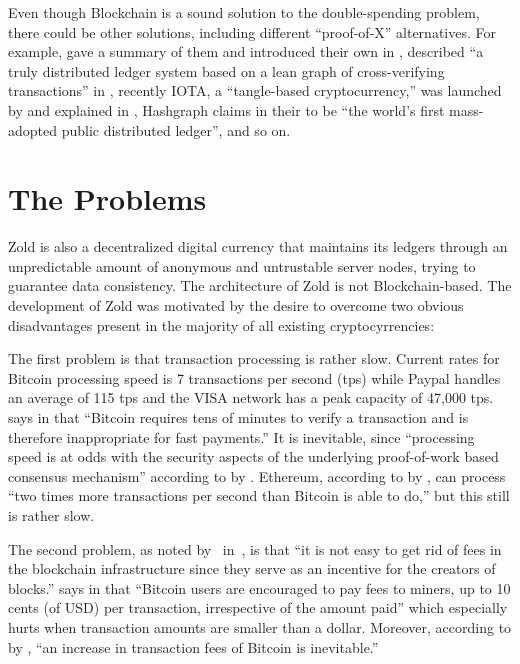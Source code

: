 \documentclass[12pt,oneside]{article}
\begin{document}
Even though Blockchain is a sound solution to the double-spending
problem, there could be other solutions,
including different ``proof-of-X'' alternatives.%
For example, \citeauthor{everaere2010} gave
a summary of them and introduced their own in ,
\citeauthor{boyen2016} described
``a truly distributed ledger system based on a lean graph of cross-verifying transactions''
in ,
recently IOTA, a ``tangle-based cryptocurrency,'' was launched by
\citeauthor{popov2017} and explained in ,
Hashgraph claims in their 
to be ``the world's first mass-adopted public distributed ledger'',
and so on.

\pagebreak

\section*{The Problems}

Zold is also a decentralized digital currency that maintains its ledgers
through an unpredictable amount of anonymous and untrustable server nodes, trying to guarantee
data consistency. The architecture of Zold is not Blockchain-based.
The development of Zold was motivated by the desire to overcome
two obvious disadvantages present in the majority of all existing cryptocyrrencies:

The first problem is that transaction processing is rather slow.
Current rates for Bitcoin processing speed is 7 transactions per second (tps)
while Paypal handles an average of 115 tps and the VISA
network has a peak capacity of 47,000 tps.
\citeauthor{karame2012} says in 
that ``Bitcoin requires tens of minutes to verify a transaction
and is therefore inappropriate for fast payments.''
It is inevitable, since
``processing speed is at odds with the security aspects of the underlying
proof-of-work based consensus mechanism'' according
to  by \citeauthor{kiayias2015}.
Ethereum, according to  by \citeauthor{fekkes2018}, can process
``two times more transactions per second than Bitcoin is able to do,''
but this still is rather slow.

The second problem, as noted by~\citeauthor{popov2017} in~,
is that ``it is not easy to get rid
of fees in the blockchain infrastructure since they serve
as an incentive for the creators of blocks.''
\citeauthor{moser2015} says in  that ``Bitcoin users are encouraged to
pay fees to miners, up to 10 cents (of USD) per transaction, irrespective of the
amount paid'' which especially hurts when transaction amounts are smaller than a dollar.
Moreover, according to  by \citeauthor{kaskaloglu2014},
``an increase in transaction fees of Bitcoin is inevitable.''
\end{document}
